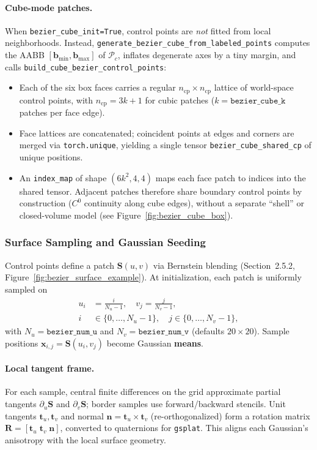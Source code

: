 \documentclass{report}
\newcommand{\code}[1]{\nolinkurl{#1}}
\begin{document}
\paragraph{Cube-mode patches.}
When \code{bezier\_cube\_init=True}, control points are \emph{not} fitted from local neighborhoods. Instead, \code{generate\_bezier\_cube\_from\_labeled\_points} computes the AABB $[\mathbf{b}_{\min},\mathbf{b}_{\max}]$ of $\mathcal{P}_c$, inflates degenerate axes by a tiny margin, and calls \code{build\_cube\_bezier\_control\_points}:
\begin{itemize}
    \item Each of the six box faces carries a regular $n_{\mathrm{cp}}\times n_{\mathrm{cp}}$ lattice of world-space control points, with $n_{\mathrm{cp}} = 3k+1$ for cubic patches ($k=\texttt{bezier\_cube\_k}$ patches per face edge).
    \item Face lattices are concatenated; coincident points at edges and corners are merged via \code{torch.unique}, yielding a single tensor \code{bezier\_cube\_shared\_cp} of unique positions.
    \item An \code{index\_map} of shape $(6k^2,4,4)$ maps each face patch to indices into the shared tensor. Adjacent patches therefore share boundary control points by construction ($C^0$ continuity along cube edges), without a separate ``shell'' or closed-volume model (see Figure~\ref{fig:bezier_cube_box}).
\end{itemize}

\subsubsection{Surface Sampling and Gaussian Seeding}
\label{subsec:bezier_surface_sampling}

Control points define a patch $\mathbf{S}(u,v)$ via Bernstein blending (Section~2.5.2, Figure~\ref{fig:bezier_surface_example}). At initialization, each patch is uniformly sampled on
\begin{align}
u_i &= \frac{i}{N_u-1},\quad v_j = \frac{j}{N_v-1}, \\
i &\in \{0,\ldots,N_u-1\},\quad j \in \{0,\ldots,N_v-1\},
\end{align}
with $N_u=\texttt{bezier\_num\_u}$ and $N_v=\texttt{bezier\_num\_v}$ (defaults $20\times 20$). Sample positions $\mathbf{x}_{i,j}=\mathbf{S}(u_i,v_j)$ become Gaussian \textbf{means}.

\paragraph{Local tangent frame.}
For each sample, central finite differences on the grid approximate partial tangents $\partial_u\mathbf{S}$ and $\partial_v\mathbf{S}$; border samples use forward/backward stencils. Unit tangents $\mathbf{t}_u,\mathbf{t}_v$ and normal $\mathbf{n}=\mathbf{t}_u\times\mathbf{t}_v$ (re-orthogonalized) form a rotation matrix $\mathbf{R}=[\mathbf{t}_u\;\mathbf{t}_v\;\mathbf{n}]$, converted to quaternions for \texttt{gsplat}. This aligns each Gaussian's anisotropy with the local surface geometry.
\end{document}
